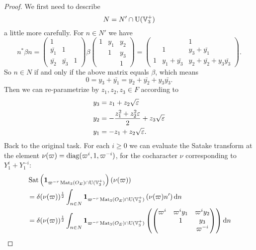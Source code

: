 \begin{proof}
  We first need to describe \[ N = N' \cap \operatorname{U}(\mathbb V_3^+) \] a little more carefully.
  For $n \in N'$ we have
  \[
    n^\ast \beta n
    =
    \begin{pmatrix} 1 \\ \bar{y_1} & 1 \\ \bar{y_2} & \bar{y_3} & 1 \end{pmatrix}
    \beta
    \begin{pmatrix}
      1 & y_1 & y_2 \\
        & 1 & y_3 \\
        & & 1
    \end{pmatrix}
    = \begin{pmatrix}
      & & 1 \\
      & 1 & y_3 + \bar{y_1} \\
      1 & y_1 + \bar{y_3} & y_2 + \bar{y_2} + y_3 \bar{y_3}
    \end{pmatrix}.
  \]
  So $n \in N$ if and only if the above matrix equals $\beta$, which means
  \[ 0 = y_3 + \bar{y_1} = y_2 + \bar{y_2} + y_3 \bar{y_3}. \]
  Then we can re-parametrize by $z_1, z_2, z_3 \in F$ according to
  \begin{align*}
    y_3 &= z_1 + z_2 \sqrt{\varepsilon} \\
    y_2 &= -\frac{z_1^2 + z_2^2 \varepsilon}{2} + z_3\sqrt{\varepsilon} \\
    y_1 &= -z_1 + z_2\sqrt{\varepsilon}.
  \end{align*}
  Back to the original task.
  For each $i \ge 0$ we can evaluate the Satake transform at the element
  $\nu(\varpi) = \operatorname{diag}(\varpi^i, 1, \varpi^{-i})$, for the cocharacter $\nu$
  corresponding to $Y_1^i + Y_1^{-i}$:
  \begin{align*}
    &\Sat\left( \mathbf{1}_{\varpi^{-r} \Mat_3(\OO_E) \cap \U(\VV_3^+)}\right)
      \left( \nu(\varpi)  \right) \\
    &= \delta(\nu(\varpi))^\half \int_{n \in N}
      \mathbf{1}_{\varpi^{-r} \Mat_3(\OO_E) \cap \U(\VV_3^+)}
      \left( \nu(\varpi) n' \right) \odif n \\
    &= \delta(\nu(\varpi))^\half \int_{n \in N}
      \mathbf{1}_{{\varpi^{-r}} \Mat_3(\OO_E) \cap \U(\VV_3^+)}
      \left( \begin{pmatrix} \varpi^i & \varpi^i y_1 & \varpi^i y_2 \\
               & 1 & y_3 \\
               & & \varpi^{-i} \end{pmatrix} \right) \odif n
  \end{align*}

\end{proof}

